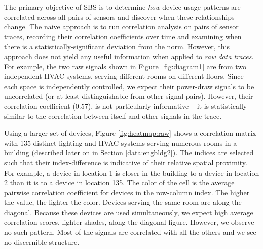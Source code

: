 The primary objective of SBS is to determine \emph{how} device usage patterns are correlated across all pairs of sensors and 
discover when these relationships change.  
The naive approach is to run correlation analysis on pairs of sensor traces, recording their correlation coefficients over time and 
examining when there is a statistically-significant deviation from the norm.  
However, this approach does not yield any useful information when applied to \emph{raw data traces}.
For example, the two raw signals shown in Figure~\ref{fig:diagram1} are from two independent HVAC systems,
 serving different rooms on different floors.
Since each space is independently controlled, we expect their power-draw signals to be uncorrelated (or at least distinguishable 
from other signal pairs).  However, their correlation coefficient ($0.57$), is not particularly informative -- it is statistically
similar to the correlation between itself and other signals in the trace.  

Using a larger set of devices, Figure \ref{fig:heatmap:raw} shows a correlation matrix with 135 distinct lighting and HVAC systems serving numerous rooms in a building (described later on in Section \ref{data:engbldg2}).
The indices are selected such that their index-difference is indicative of their relative spatial proximity.  
For example, a device in location 1 is closer in the building to a device in location 2 than it is to 
a device in location 135. 
The color of the cell is the average pairwise correlation coefficient for devices in the row-column index.  The higher the value, the lighter the color.
Devices serving the same room are along the diagonal.  Because these devices are used simultaneously, we expect
high average correlation scores, lighter shades, along the diagonal figure.
However, we observe no such pattern.  %
Most of the signals are correlated with all the others and we see no discernible structure.

